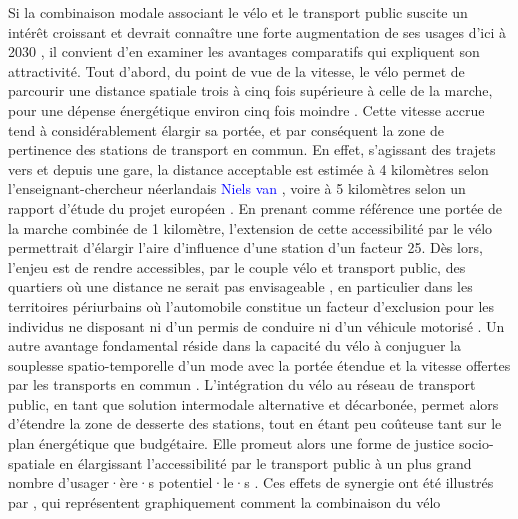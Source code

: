 \begin{refsegment}
Si la combinaison modale associant le vélo et le transport public suscite un intérêt croissant et devrait connaître une forte augmentation de ses usages d’ici à 2030 \textcolor{blue}{\autocite[119]{goletz_intermodality_2020}}, il convient d’en examiner les avantages comparatifs qui expliquent son attractivité. Tout d’abord, du point de vue de la vitesse, le vélo permet de parcourir une distance spatiale trois à cinq fois supérieure à celle de la marche, pour une dépense énergétique environ cinq fois moindre \textcolor{blue}{\autocite[50]{sebban_complementarite_2003}}. Cette vitesse accrue tend à considérablement élargir sa portée, et par conséquent la zone de pertinence des stations de transport en commun. En effet, s’agissant des trajets vers et depuis une gare, la distance acceptable est estimée à 4 kilomètres selon l’enseignant-chercheur néerlandais \textcolor{blue}{Niels van} \textcolor{blue}{\textcite[4]{oort_overview_2020}}, voire à 5 kilomètres selon un rapport d’étude du projet européen \textcolor{blue}{\textcite[4]{bitibi_bike_2017}}. En prenant comme référence une portée de la marche combinée de 1 kilomètre, l’extension de cette accessibilité par le vélo permettrait d’élargir l’aire d’influence d’une station d’un facteur 25. Dès lors, l’enjeu est de rendre accessibles, par le couple vélo et transport public, des quartiers où une distance  ne serait pas envisageable \textcolor{blue}{\autocite[17]{nlc_micromobility_2019}}, en particulier dans les territoires périurbains où l’automobile constitue un facteur d’exclusion pour les individus ne disposant ni d’un permis de conduire ni d’un véhicule motorisé \textcolor{blue}{\autocite[85]{cervero_bike-and-ride_2013}}. Un autre avantage fondamental réside dans la capacité du vélo à conjuguer la souplesse spatio-temporelle d’un mode  avec la portée étendue et la vitesse offertes par les transports en commun \textcolor{blue}{\autocite[212]{kager_characterisation_2016}}. L’intégration du vélo au réseau de transport public, en tant que solution intermodale alternative et décarbonée, permet alors d’étendre la zone de desserte des stations, tout en étant peu coûteuse tant sur le plan énergétique que budgétaire. Elle promeut alors une forme de justice socio-spatiale en élargissant l’accessibilité par le transport public à un plus grand nombre d’usager·ère·s potentiel·le·s \textcolor{blue}{\autocite[99-100]{levine_mobility_2019}}. Ces effets de synergie ont été illustrés par \textcolor{blue}{\textcite[212]{kager_characterisation_2016}}, qui représentent graphiquement comment la combinaison du vélo 
\end{refsegment}
